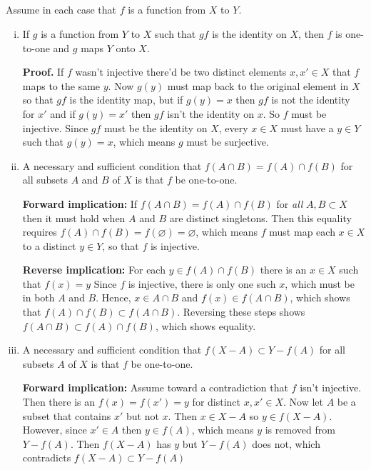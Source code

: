 \documentclass{article}
\begin{document}
\subsection{} Assume in each case that $f$ is a function from $X$ to $Y$.

\begin{enumerate}[(i)]
    \item If $g$ is a function from $Y$ to $X$ such that $gf$ is the identity on $X$, then $f$ is one-to-one and $g$ maps $Y$ onto $X$.

    \textbf{Proof.} If $f$ wasn't injective there'd be two distinct elements $x, x' \in X$ that $f$ maps to the same $y$. Now $g(y)$ must map back to the original element in $X$ so that $gf$ is the identity map, but if $g(y) = x$ then $gf$ is not the identity for $x'$ and if $g(y) = x'$ then $gf$ isn't the identity on $x$. So $f$ must be injective. Since $gf$ must be the identity on $X$, every $x \in X$ must have a $y \in Y$ such that $g(y) = x$, which means $g$ must be surjective.

    \item A necessary and sufficient condition that $f(A \cap B) = f(A) \cap f(B)$ for all subsets $A$ and $B$ of $X$ is that $f$ be one-to-one.
    
    \textbf{Forward implication:} If $f(A \cap B) = f(A) \cap f(B)$ for \textit{all} $A, B \subset X$ then it must hold when $A$ and $B$ are distinct singletons. Then this equality requires $f(A) \cap f(B) = f(\varnothing) = \varnothing$, which means $f$ must map each $x \in X$ to a distinct $y \in Y$, so that $f$ is injective. 

    \textbf{Reverse implication:} For each $y \in f(A) \cap f(B)$ there is an $x \in X$ such that $f(x) = y$ Since $f$ is injective, there is only one such $x$, which must be in both $A$ and $B$. Hence, $x \in A\cap B$ and $f(x) \in f(A \cap B)$, which shows that $f(A) \cap f(B) \subset f(A \cap B)$. Reversing these steps shows $f(A \cap B) \subset f(A) \cap f(B)$, which shows equality. 

    \item A necessary and sufficient condition that $f(X - A) \subset Y - f(A)$ for all subsets $A$ of $X$ is that $f$ be one-to-one.

    \textbf{Forward implication:} Assume toward a contradiction that $f$ isn't injective. Then there is an $f(x) = f(x') = y$ for distinct $x, x' \in X$. Now let $A$ be a subset that contains $x'$ but not $x$. Then $x \in X - A$ so $y \in f(X - A)$. However, since $x' \in A$ then $y \in f(A)$, which means $y$ is removed from $Y - f(A)$. Then $f(X - A)$ has $y$ but $Y - f(A)$ does not, which contradicts $f(X - A) \subset Y - f(A)$


\end{enumerate}
\end{document}
